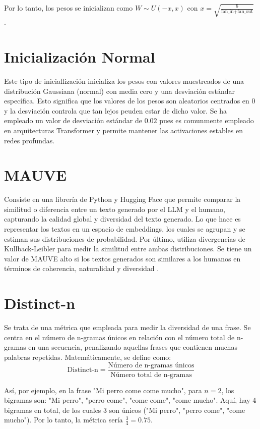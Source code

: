 \documentclass[11pt]{book}
\begin{document}
Por lo tanto, los pesos se inicializan como $W \sim U(-x, x)$ con $x = \sqrt{\frac{6}{\text{fan\_in} + \text{fan\_out}}}$ \parencite{365datascience_xavier_init}.


\section{Inicialización Normal} \label{sec:normal}

Este tipo de iniciallización inicializa los pesos con valores muestreados de una distribución Gaussiana (normal) con media cero y una desviación estándar específica. Esto significa que los valores de los pesos son aleatorios centrados en $0$ y la desviación controla que tan lejos peuden estar de dicho valor. Se ha empleado un valor de desviación estándar de $0.02$ pues es comunmente empleado en arquitecturas Transformer y permite mantener las activaciones estables en redes profundas.

\section{MAUVE} \label{sec:mauve}

Consiste en una librería de Python y Hugging Face que permite comparar la similitud o diferencia entre un texto generado por el LLM y el humano, capturando la calidad global y diversidad del texto generado. Lo que hace es representar los textos en un espacio de embeddings, los cuales se agrupan y se estiman sus distribuciones de probabilidad. Por último, utiliza divergencias de Kullback-Leibler para medir la similitud entre ambas distribuciones. Se tiene un valor de MAUVE alto si los textos generados son similares a los humanos en términos de coherencia, naturalidad y diversidad \parencite{pillutla2021mauve_software}.
\section{Distinct-n} \label{sec:distinct-n}

Se trata de una métrica que empleada para medir la diversidad de una frase. Se centra en el número de n-gramas únicos en relación con el número total de n-gramas en una secuencia, penalizando aquellas frases que contienen muchas palabras repetidas. Matemáticamente, se define como:
\[
\text{Distinct-n} = \frac{\text{Número de n-gramas únicos}}{\text{Número total de n-gramas}}
\]

Así, por ejemplo, en la frase "Mi perro come come mucho", para $n=2$, los bigramas son: "Mi perro", "perro come", "come come", "come mucho". Aquí, hay 4 bigramas en total, de los cuales 3 son únicos ("Mi perro", "perro come", "come mucho"). Por lo tanto, la métrica sería $\frac{3}{4} = 0.75$.
\end{document}
